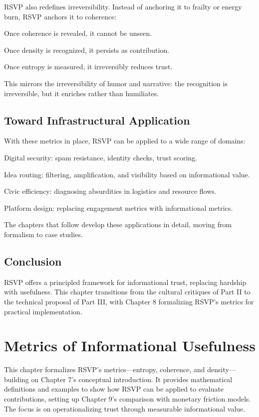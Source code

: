 \documentclass{book}
\begin{document}
RSVP also redefines irreversibility. Instead of anchoring it to frailty or energy burn, RSVP anchors it to coherence:

Once coherence is revealed, it cannot be unseen.

Once density is recognized, it persists as contribution.

Once entropy is measured, it irreversibly reduces trust.

This mirrors the irreversibility of humor and narrative: the recognition is irreversible, but it enriches rather than humiliates.

\section{Toward Infrastructural Application}

With these metrics in place, RSVP can be applied to a wide range of domains:

Digital security: spam resistance, identity checks, trust scoring.

Idea routing: filtering, amplification, and visibility based on informational value.

Civic efficiency: diagnosing absurdities in logistics and resource flows.

Platform design: replacing engagement metrics with informational metrics.

The chapters that follow develop these applications in detail, moving from formalism to case studies.

\section{Conclusion}

RSVP offers a principled framework for informational trust, replacing hardship with usefulness. This chapter transitions from the cultural critiques of Part II to the technical proposal of Part III, with Chapter 8 formalizing RSVP’s metrics for practical implementation.

\chapter{Metrics of Informational Usefulness}

This chapter formalizes RSVP’s metrics—entropy, coherence, and density—building on Chapter 7’s conceptual introduction. It provides mathematical definitions and examples to show how RSVP can be applied to evaluate contributions, setting up Chapter 9’s comparison with monetary friction models. The focus is on operationalizing trust through measurable informational value.
\end{document}
